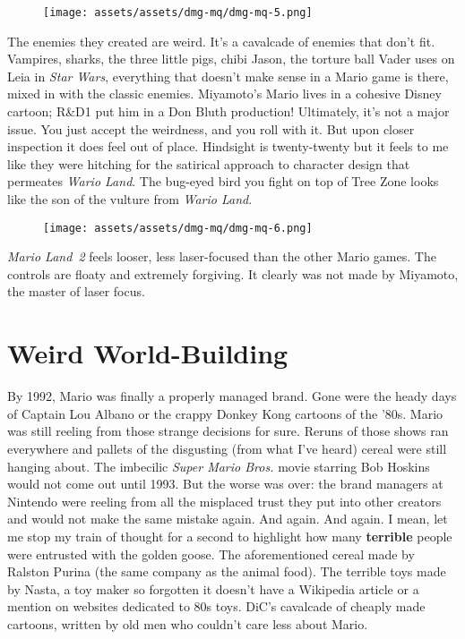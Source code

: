 \documentclass{book}
\begin{document}
\begin{figure}[hbt]
\vskip 10pt
\centering \texttt{[image: assets/assets/dmg-mq/dmg-mq-5.png]}
\vskip 6pt
\end{figure}

The enemies they created are weird. It’s a cavalcade of enemies that don’t fit. Vampires, sharks, the three little pigs, chibi Jason, the torture ball Vader uses on Leia in \emph{Star Wars}, everything that doesn’t make sense in a Mario game is there, mixed in with the classic enemies. Miyamoto’s Mario lives in a cohesive Disney cartoon; R\&D1 put him in a Don Bluth production! Ultimately, it’s not a major issue. You just accept the weirdness, and you roll with it. But upon closer inspection it does feel out of place. Hindsight is twenty-twenty but it feels to me like they were hitching for the satirical approach to character design that permeates \emph{Wario Land}. The bug-eyed bird you fight on top of Tree Zone looks like the son of the vulture from \emph{Wario Land}.

\begin{figure}[hbt]
\vskip 10pt
\centering \texttt{[image: assets/assets/dmg-mq/dmg-mq-6.png]}
\vskip 6pt
\end{figure}

\emph{Mario Land 2} feels looser, less laser-focused than the other Mario games. The controls are floaty and extremely forgiving. It clearly was not made by Miyamoto, the master of laser focus.

\FloatBarrier\needspace{10mm}\section*{Weird World-Building}\nopagebreak[4]

By 1992, Mario was finally a properly managed brand. Gone were the heady days of Captain Lou Albano or the crappy Donkey Kong cartoons of the ’80s. Mario was still reeling from those strange decisions for sure. Reruns of those shows ran everywhere and pallets of the disgusting (from what I’ve heard) cereal were still hanging about. The imbecilic \emph{Super Mario Bros.} movie starring Bob Hoskins would not come out until 1993. But the worse was over: the brand managers at Nintendo were reeling from all the misplaced trust they put into other creators and would not make the same mistake again. And again. And again. I mean, let me stop my train of thought for a second to highlight how many \textbf{terrible} people were entrusted with the golden goose. The aforementioned cereal made by Ralston Purina (the same company as the animal food). The terrible toys made by Nasta, a toy maker so forgotten it doesn’t have a Wikipedia article or a mention on websites dedicated to 80s toys. DiC’s cavalcade of cheaply made cartoons, written by old men who couldn’t care less about Mario.
\end{document}

